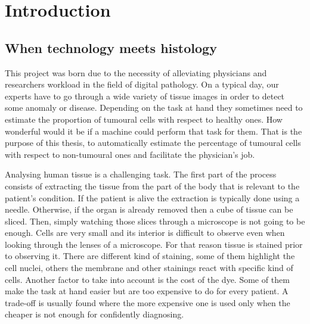 \chapter{Introduction}
\section{When technology meets histology}

This project was born due to the necessity of alleviating physicians and researchers workload in the field of digital pathology. On a typical day, our experts have to go through a wide variety of tissue images in order to detect some anomaly or disease. Depending on the task at hand they sometimes need to estimate the proportion of tumoural cells with respect to healthy ones. How wonderful would it be if a machine could perform that task for them. That is the purpose of this thesis, to automatically estimate the percentage of tumoural cells with respect to non-tumoural ones and facilitate the physician's job.

Analysing human tissue is a challenging task. The first part of the process consists of extracting the tissue from the part of the body that is relevant to the patient's condition. If the patient is alive the extraction is typically done using a needle. Otherwise, if the organ is already removed then a cube of tissue can be sliced. Then, simply watching those slices through a microscope is not going to be enough. Cells are very small and its interior is difficult to observe even when looking through the lenses of a microscope. For that reason tissue is stained prior to observing it. There are different kind of staining, some of them highlight the cell nuclei, others the membrane and other stainings react with specific kind of cells. Another factor to take into account is the cost of the dye. Some of them make the task at hand easier but are too expensive to do for every patient. A trade-off is usually found where the more expensive one is used only when the cheaper is not enough for confidently diagnosing.

